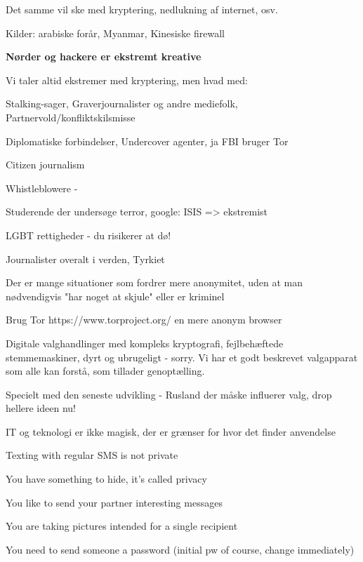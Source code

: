 \documentclass[20pt,landscape,a4paper,footrule]{foils}
\begin{document}
Det samme vil ske med kryptering, nedlukning af internet, osv.

Kilder: arabiske forår, Myanmar, Kinesiske firewall

\vskip 1cm
\centerline{\bf Nørder og hackere er ekstremt kreative}




Vi taler altid ekstremer med kryptering, men hvad med:
\begin{list2}
\item Stalking-sager, Graverjournalister og andre mediefolk, Partnervold/konfliktskilsmisse
\item Diplomatiske forbindelser, Undercover agenter, ja FBI bruger Tor
\item Citizen journalism 
\item Whistleblowere - 
\item Studerende der undersøge terror, google: ISIS => ekstremist
\item LGBT rettigheder - du risikerer at dø!
\item Journalister overalt i verden, Tyrkiet
\end{list2}

Der er mange situationer som fordrer mere anonymitet, uden at man nødvendigvis "har noget at skjule" eller er kriminel

Brug Tor https://www.torproject.org/ en mere anonym browser


Digitale valghandlinger med kompleks kryptografi, fejlbehæftede stemmemaskiner, dyrt og ubrugeligt - sorry. Vi har et godt beskrevet valgapparat som alle kan forstå, som tillader genoptælling.

Specielt med den seneste udvikling - Rusland der måske influerer
valg, drop hellere ideen nu!

IT og teknologi er ikke magisk, der er grænser for hvor det finder anvendelse




\begin{list2}
\item Texting with regular SMS is not private
\item You have something to hide, it's called privacy
\item You like to send your partner interesting messages
\item You are taking pictures intended for a single recipient
\item You need to send someone a password (initial pw of course, change immediately)
\end{list2}
\end{document}
